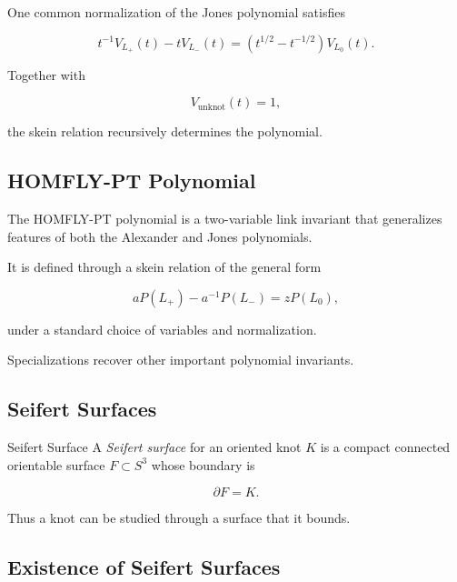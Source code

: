 One common normalization of the Jones polynomial satisfies

\[
\boxed{
t^{-1}V_{L_+}(t)
-
tV_{L_-}(t)
=
\left(
t^{1/2}-t^{-1/2}
\right)V_{L_0}(t).
}
\]

Together with

\[
\boxed{
V_{\text{unknot}}(t)=1,
}
\]

the skein relation recursively determines the polynomial.

\subsection{HOMFLY-PT Polynomial}
\label{subsec:homfly-pt}

The HOMFLY-PT polynomial is a two-variable link invariant that generalizes
features of both the Alexander and Jones polynomials.

It is defined through a skein relation of the general form

\[
\boxed{
aP(L_+)-a^{-1}P(L_-)
=
zP(L_0),
}
\]

under a standard choice of variables and normalization.

Specializations recover other important polynomial invariants.

\subsection{Seifert Surfaces}
\label{subsec:seifert-surfaces}

\begin{definitionbox}{Seifert Surface}
A \emph{Seifert surface} for an oriented knot \(K\) is a compact connected
orientable surface \(F\subset S^3\) whose boundary is

\[
\boxed{
\partial F=K.
}
\]
\end{definitionbox}

Thus a knot can be studied through a surface that it bounds.

\subsection{Existence of Seifert Surfaces}
\label{subsec:existence-seifert-surfaces}

